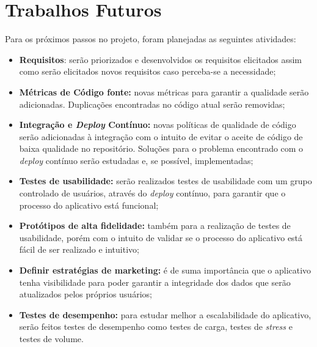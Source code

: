 \section{Trabalhos Futuros}

Para os próximos passos no projeto, foram planejadas as seguintes atividades:

\begin{itemize}
    \item \textbf{Requisitos}: serão priorizados e desenvolvidos os requisitos elicitados assim como serão elicitados novos requisitos caso perceba-se a necessidade;
    \item \textbf{Métricas de Código fonte:} novas métricas para garantir a qualidade serão adicionadas. Duplicações encontradas no código atual serão removidas;
    \item \textbf{Integração e \textit{Deploy} Contínuo:} novas políticas de qualidade de código serão adicionadas à integração com o intuito de evitar o aceite de código de baixa qualidade no repositório. Soluções para o problema encontrado com o \textit{deploy} contínuo serão estudadas e, se possível, implementadas;
    \item \textbf{Testes de usabilidade:} serão realizados testes de usabilidade com um grupo controlado de usuários, através do \textit{deploy} contínuo, para garantir que o processo do aplicativo está funcional;
    \item \textbf{Protótipos de alta fidelidade:} também para a realização de testes de usabilidade, porém com o intuito de validar se o processo do aplicativo está fácil de ser realizado e intuitivo;
    \item \textbf{Definir estratégias de marketing:} é de suma importância que o aplicativo tenha visibilidade para poder garantir a integridade dos dados que serão atualizados pelos próprios usuários;
    \item \textbf{Testes de desempenho:} para estudar melhor a escalabilidade do aplicativo, serão feitos testes de desempenho como testes de carga, testes de \textit{stress} e testes de volume.
\end{itemize}
